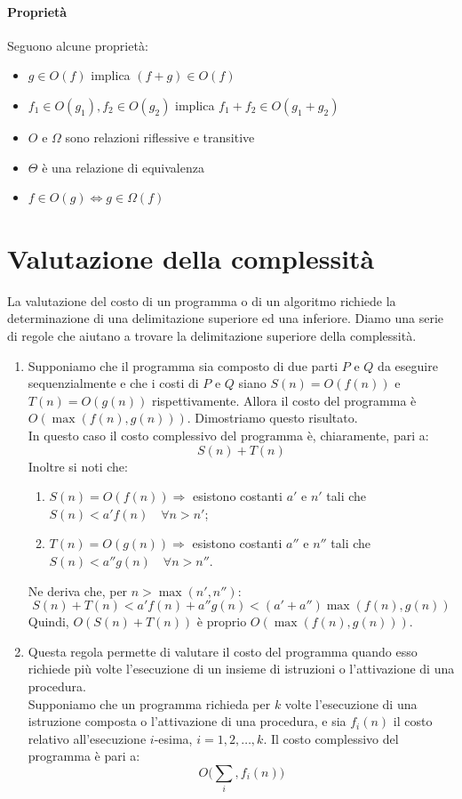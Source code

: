 \documentclass[12pt]{report}
\begin{document}
   	\paragraph{Proprietà} Seguono alcune proprietà:
   	\begin{itemize}
   		\item $g \in O(f)$ implica $(f + g) \in O(f)$
   		\item $f_1 \in O(g_1), f_2 \in O(g_2)$ implica $f_1 + f_2 \in O(g_1 + g_2)$
   		\item $O$ e $\Omega$ sono relazioni riflessive e transitive
   		\item $\Theta$ è una relazione di equivalenza
   		\item $f\in O(g) \iff g \in \Omega(f)$
   	\end{itemize}
   	\section{Valutazione della complessità}
   	La valutazione del costo di un programma o di un algoritmo richiede la determinazione di una delimitazione superiore ed una inferiore. Diamo una serie di regole che aiutano a trovare la delimitazione superiore della complessità.
   	\begin{enumerate}
   		\item Supponiamo che il programma sia composto di due parti $P$ e $Q$ da eseguire sequenzialmente e che i costi di $P$ e $Q$ siano $S(n)=O(f(n))$ e $T(n) = O(g(n))$ rispettivamente. Allora il costo del programma è $O(\max(f(n), g(n)))$. Dimostriamo questo risultato. \\
   		In questo caso il costo complessivo del programma è, chiaramente, pari a:
   		\[
   		S(n) + T(n)
   		\]
   		Inoltre si noti che:
   		\begin{enumerate}
   			\item $S(n) = O(f(n)) \Rightarrow$ esistono costanti $a'$ e $n'$ tali che $S(n) < a'f(n) \quad \forall n > n'$;
   			\item $T(n) = O(g(n)) \Rightarrow$ esistono costanti $a''$ e $n''$ tali che $S(n) < a''g(n) \quad \forall n > n''$.
   		\end{enumerate}
   		Ne deriva che, per $n > \max(n', n'')$:
   		\[
   		S(n) + T(n) < a'f(n) + a''g(n) < (a' + a'')\max(f(n), g(n))
   		\]
   		Quindi, $O(S(n) + T(n))$ è proprio $O(\max(f(n), g(n)))$.
   		\item Questa regola permette di valutare il costo del programma quando esso richiede più volte l'esecuzione di un insieme di istruzioni o l'attivazione di una procedura. \\
   		Supponiamo che un programma richieda per $k$ volte l'esecuzione di una istruzione composta o l'attivazione di una procedura, e sia $f_i(n)$ il costo relativo all'esecuzione $i$-esima, $i = 1, 2, \dots, k$. Il costo complessivo del programma è pari a:
   		\[
   		O\Bigg(\sum_{i}, f_i(n)\Bigg)
   		\]
   	\end{enumerate}
\end{document}
